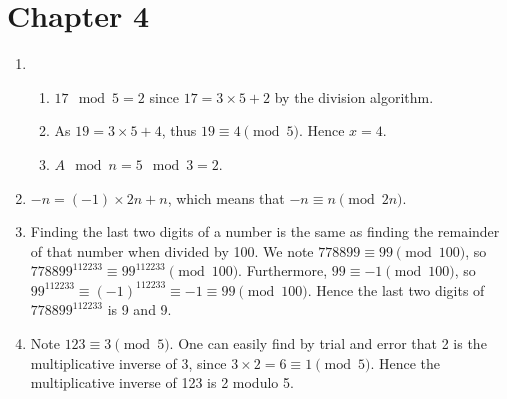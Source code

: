 \section*{Chapter 4}
\begin{enumerate}
    \item \begin{enumerate}[label=(\alph*)]
        \item $17 \mod 5 = 2$ since $17 = 3 \times 5 + 2$ by the division algorithm.
        \item As $19 = 3 \times 5 + 4$, thus $19 \equiv 4 \pmod 5$. Hence $x = 4$.
        \item $A \mod n = 5 \mod 3 = 2$.
    \end{enumerate}
    \item $-n = (-1) \times 2n + n$, which means that $-n \equiv n \pmod{2n}$.
    \item Finding the last two digits of a number is the same as finding the remainder of that number when divided by 100. We note $778899 \equiv 99 \pmod{100}$, so $778899^{112233} \equiv 99^{112233} \pmod{100}$. Furthermore, $99 \equiv -1 \pmod{100}$, so $99^{112233}\equiv (-1)^{112233} \equiv -1 \equiv 99 \pmod{100}$. Hence the last two digits of $778899^{112233}$ is 9 and 9.
    \item Note $123 \equiv 3 \pmod 5$. One can easily find by trial and error that 2 is the multiplicative inverse of 3, since $3 \times 2 = 6 \equiv 1 \pmod 5$. Hence the multiplicative inverse of 123 is 2 modulo 5.
\end{enumerate}

